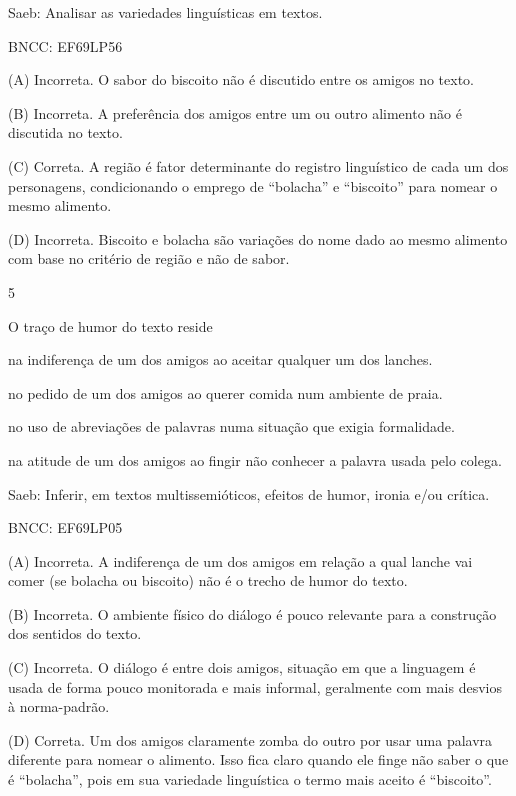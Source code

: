 Saeb: Analisar as variedades linguísticas em textos.

BNCC: EF69LP56

(A) Incorreta. O sabor do biscoito não é discutido entre os amigos no
texto.

(B) Incorreta. A preferência dos amigos entre um ou outro alimento não é
discutida no texto.

(C) Correta. A região é fator determinante do registro linguístico de
cada um dos personagens, condicionando o emprego de ``bolacha'' e
``biscoito'' para nomear o mesmo alimento.

(D) Incorreta. Biscoito e bolacha são variações do nome dado ao mesmo
alimento com base no critério de região e não de sabor.

\num{5}

O traço de humor do texto reside

\begin{escolha}
\item na indiferença de um dos amigos ao aceitar qualquer um dos lanches.

\item no pedido de um dos amigos ao querer comida num ambiente de praia.

\item no uso de abreviações de palavras numa situação que exigia
formalidade.

\item na atitude de um dos amigos ao fingir não conhecer a palavra usada
pelo colega.
\end{escolha}

Saeb: Inferir, em textos multissemióticos, efeitos de humor, ironia e/ou
crítica.

BNCC: EF69LP05

(A) Incorreta. A indiferença de um dos amigos em relação a qual lanche
vai comer (se bolacha ou biscoito) não é o trecho de humor do texto.

(B) Incorreta. O ambiente físico do diálogo é pouco relevante para a
construção dos sentidos do texto.

(C) Incorreta. O diálogo é entre dois amigos, situação em que a
linguagem é usada de forma pouco monitorada e mais informal, geralmente
com mais desvios à norma-padrão.

(D) Correta. Um dos amigos claramente zomba do outro por usar uma
palavra diferente para nomear o alimento. Isso fica claro quando ele
finge não saber o que é ``bolacha'', pois em sua variedade linguística o
termo mais aceito é ``biscoito''.

